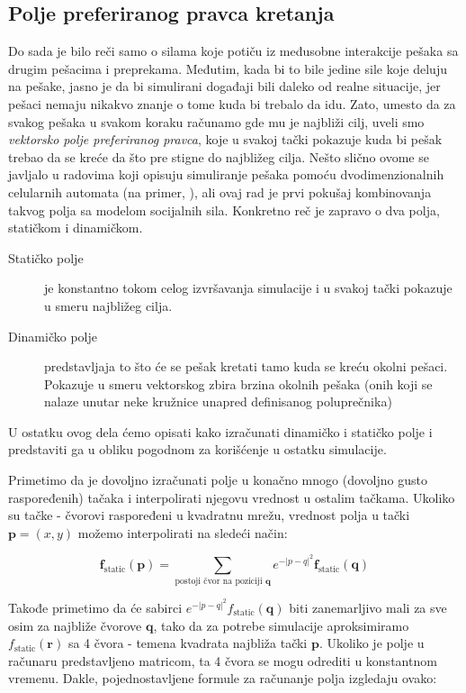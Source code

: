 \documentclass[12pt]{article}
\begin{document}
    \subsection{Polje preferiranog pravca kretanja}
    Do sada je bilo reči samo o silama koje potiču iz međusobne interakcije pešaka sa drugim pešacima i preprekama. Međutim, kada bi to bile jedine sile koje deluju na pešake, jasno je da bi simulirani događaji bili daleko od realne situacije, jer pešaci nemaju nikakvo znanje o tome kuda bi trebalo da idu. Zato, umesto da za svakog pešaka u svakom koraku računamo gde mu je najbliži cilj, uveli smo \emph{vektorsko polje preferiranog pravca}, koje u svakoj tački pokazuje kuda bi pešak trebao da se kreće da što pre stigne do najbližeg cilja. Nešto slično ovome se javljalo u radovima koji opisuju simuliranje pešaka pomoću dvodimenzionalnih celularnih automata (na primer, \citep{Burstedde2001}), ali ovaj rad je prvi pokušaj kombinovanja takvog polja sa modelom socijalnih sila. Konkretno reč je zapravo o dva polja, statičkom i dinamičkom.
    \begin{description}
        \item[Statičko polje] je konstantno tokom celog izvršavanja simulacije i u svakoj tački pokazuje u smeru najbližeg cilja.
        \item[Dinamičko polje] predstavljaja to što će se pešak kretati tamo kuda se kreću okolni pešaci. Pokazuje u smeru vektorskog zbira brzina okolnih pešaka (onih koji se nalaze unutar neke kružnice unapred definisanog poluprečnika)
    \end{description}
    U ostatku ovog dela ćemo opisati kako izračunati dinamičko i statičko polje i predstaviti ga u obliku pogodnom za korišćenje u ostatku simulacije. 
    
    Primetimo da je dovoljno izračunati polje u konačno mnogo (dovoljno gusto raspoređenih) tačaka i interpolirati njegovu vrednost u ostalim tačkama. Ukoliko su tačke - čvorovi raspoređeni u kvadratnu mrežu, vrednost polja u tački $\mathbf p = (x,y)$ možemo interpolirati na sledeći način:
    
    $$
    	\mathbf f_\text{static} (\mathbf p) = \sum_{\text{postoji čvor na poziciji } \mathbf q} e^{-|p-q|^2} \mathbf f_\text{static} (\mathbf q)
    $$
	
	Takođe primetimo da će sabirci $e^{-|p-q|^2} f_\text{static} (\mathbf q)$ biti zanemarljivo mali za sve osim za najbliže čvorove $\mathbf q$, tako da za potrebe simulacije aproksimiramo $f_\text{static} (\mathbf r)$ sa 4 čvora - temena kvadrata najbliža tački $\mathbf p$. Ukoliko je polje u računaru predstavljeno matricom, ta 4 čvora se mogu odrediti u konstantnom vremenu. Dakle, pojednostavljene formule za računanje polja izgledaju ovako:
	
\end{document}
